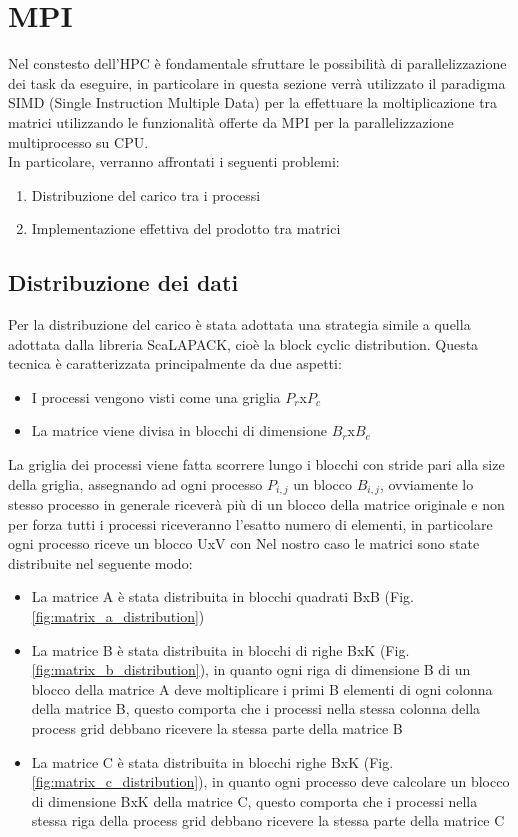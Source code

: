 \documentclass[conference]{IEEEtran}
\begin{document}
\section{MPI}
Nel constesto dell'HPC è fondamentale sfruttare le possibilità di parallelizzazione dei task da eseguire, in particolare in questa sezione verrà utilizzato il paradigma SIMD (Single Instruction Multiple Data) per la effettuare la moltiplicazione tra matrici utilizzando le funzionalità offerte da MPI per la parallelizzazione multiprocesso su CPU.\\ In particolare, verranno affrontati i seguenti problemi:
\begin{enumerate}
    \item Distribuzione del carico tra i processi
    \item Implementazione effettiva del prodotto tra matrici
\end{enumerate} 
\subsection{Distribuzione dei dati}
Per la distribuzione del carico è stata adottata una strategia simile a quella adottata dalla libreria ScaLAPACK, cioè la block cyclic distribution. Questa tecnica è caratterizzata principalmente da due aspetti:
\begin{itemize}
    \item I processi vengono visti come una griglia $P_r$x$P_c$
    \item La matrice viene divisa in blocchi di dimensione $B_r$x$B_c$
\end{itemize}
La griglia dei processi viene fatta scorrere lungo i blocchi con stride pari alla size della griglia, assegnando ad ogni processo $P_{i,j}$ un blocco $B_{i,j}$, ovviamente lo stesso processo in generale riceverà più di un blocco della matrice originale e non per forza tutti i processi riceveranno l'esatto numero di elementi, in particolare ogni processo riceve un blocco UxV con
Nel nostro caso le matrici sono state distribuite nel seguente modo:
\begin{itemize}
    \item La matrice A è stata distribuita in blocchi quadrati BxB (Fig. \ref{fig:matrix_a_distribution})
    \item La matrice B è stata distribuita in blocchi di righe BxK (Fig. \ref{fig:matrix_b_distribution}), in quanto ogni riga di dimensione B di un blocco della matrice A deve moltiplicare i primi B elementi di ogni colonna della matrice B, questo comporta che i processi nella stessa colonna della process grid debbano ricevere la stessa parte della matrice B
    \item La matrice C è stata distribuita in blocchi righe BxK (Fig. \ref{fig:matrix_c_distribution}), in quanto ogni processo deve calcolare un blocco di dimensione BxK della matrice C, questo comporta che i processi nella stessa riga della process grid debbano ricevere la stessa parte della matrice C
\end{itemize} 
\end{document}
